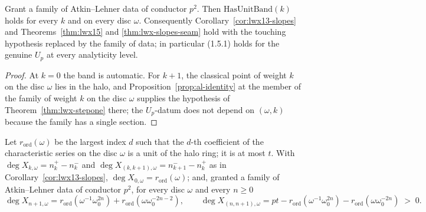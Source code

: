 \begin{theorem}
  \label{thm:lwx-unitband}
  \leanok
  Grant a family of Atkin--Lehner data of conductor $p^{2}$.  Then $\mathrm{HasUnitBand}(k)$ holds
  for every $k$ and on every disc $\omega$.  Consequently Corollary~\ref{cor:lwx13-slopes} and
  Theorems~\ref{thm:lwx15} and \ref{thm:lwx-slopes-seam} hold with the touching hypothesis replaced
  by the family of data; in particular (1.5.1) holds for the genuine $U_p$ at every analyticity
  level.
\end{theorem}

\begin{proof}
  \leanok
  At $k = 0$ the band is automatic.  For $k+1$, the classical point of weight $k$ on the disc
  $\omega$ lies in the halo, and Proposition~\ref{prop:al-identity} at the member of the family
  of weight $k$ on the disc $\omega$ supplies the hypothesis of Theorem~\ref{thm:lwx-stepone}
  there; the $U_p$-datum does not depend on $(\omega,k)$ because the family has a single section.
\end{proof}

\begin{theorem}
  \label{thm:lwx13-degrees}
  \leanok
  Let $r_{\mathrm{ord}}(\omega)$ be the largest index $d$ such that the $d$-th coefficient of the
  characteristic series on the disc $\omega$ is a unit of the halo ring; it is at most $t$.  With
  $\deg X_{k,\omega} = n_k^{+} - n_k^{-}$ and $\deg X_{(k,k+1),\omega} = n_{k+1}^{-} - n_k^{+}$ as
  in Corollary~\ref{cor:lwx13-slopes}, $\deg X_{0,\omega} = r_{\mathrm{ord}}(\omega)$; and, granted
  a family of Atkin--Lehner data of conductor $p^{2}$, for every disc $\omega$ and every $n \geq 0$
  \[
    \deg X_{n+1,\omega} = r_{\mathrm{ord}}(\omega^{-1}\omega_0^{2n})
      + r_{\mathrm{ord}}(\omega\omega_0^{-2n-2}),
    \qquad
    \deg X_{(n,n+1),\omega} = pt - r_{\mathrm{ord}}(\omega^{-1}\omega_0^{2n})
      - r_{\mathrm{ord}}(\omega\omega_0^{-2n}) \;>\; 0 .
  \]
\end{theorem}

